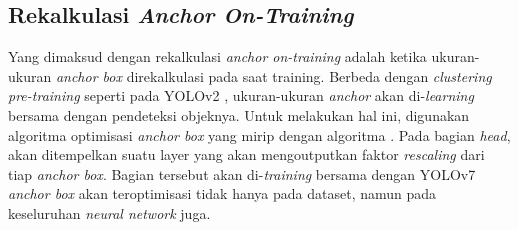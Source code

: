   \subsection{Rekalkulasi \emph{Anchor On-Training}}
    Yang dimaksud dengan rekalkulasi \emph{anchor on-training}  adalah ketika ukuran-ukuran \emph{anchor box} direkalkulasi pada saat training.
    Berbeda dengan \emph{clustering pre-training} seperti pada YOLOv2 \parencite{yolov2}, ukuran-ukuran \emph{anchor} akan di-\emph{learning} bersama dengan pendeteksi objeknya.
    Untuk melakukan hal ini, digunakan algoritma optimisasi \emph{anchor box} yang mirip dengan algoritma \textcite{anchoropt}.
    Pada bagian \emph{head}, akan ditempelkan suatu layer yang akan mengoutputkan faktor \emph{rescaling} dari tiap \emph{anchor box}.
    Bagian tersebut akan di-\emph{training} bersama dengan YOLOv7 \emph{anchor box} akan teroptimisasi tidak hanya pada dataset, namun pada keseluruhan \emph{neural network} juga.
